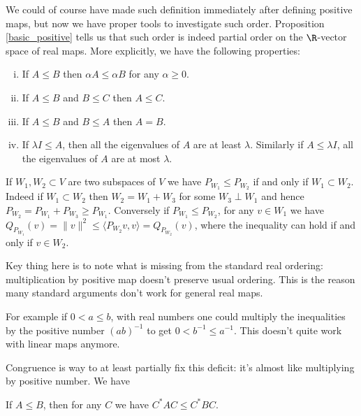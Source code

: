 We could of course have made such definition immediately after defining positive maps, but now we have proper tools to investigate such order. Proposition \ref{basic_positive} tells us that such order is indeed partial order on the $\R$-vector space of real maps. More explicitly, we have the following properties:


\begin{prop}
\begin{enumerate}[(i)]
		\item If $A \leq B$ then $\alpha A \leq \alpha B$ for any $\alpha \geq 0$.
		\item If $A \leq B$ and $B \leq C$ then $A \leq C$.
		\item If $A \leq B$ and $B \leq A$ then $A = B$.
		\item If $\lambda I \leq A$, then all the eigenvalues of $A$ are at least $\lambda$. Similarly if $A \leq \lambda I$, all the eigenvalues of $A$ are at most $\lambda$.
\end{enumerate}
\end{prop}

\begin{esim}
	If $W_{1}, W_{2} \subset V$ are two subspaces of $V$ we have $P_{W_{1}} \leq P_{W_{2}}$ if and only if $W_{1} \subset W_{2}$. Indeed if $W_{1} \subset W_{2}$ then $W_{2} = W_{1} + W_{3}$ for some $W_{3} \perp W_{1}$ and hence $P_{W_{2}} = P_{W_{1}} + P_{W_{3}} \geq P_{W_{1}}$. Conversely if $P_{W_{1}} \leq P_{W_{2}}$, for any $v \in W_{1}$ we have $Q_{{P_{W_{1}}}}(v) = \|v\|^{2} \leq \langle P_{W_{2}} v, v \rangle = Q_{P_{W_{2}}}(v)$, where the inequality can hold if and only if $v \in W_{2}$.
\end{esim}

Key thing here is to note what is missing from the standard real ordering: multiplication by positive map doesn't preserve usual ordering. This is the reason many standard arguments don't work for general real maps.

For example if $0 < a \leq b$, with real numbers one could multiply the inequalities by the positive number $(a b)^{-1}$ to get $0 < b^{-1} \leq a^{-1}$. This doesn't quite work with linear maps anymore.

Congruence is way to at least partially fix this deficit: it's almost like multiplying by positive number. We have
\begin{prop}
	If $A \leq B$, then for any $C$ we have $C^{*} A C \leq C^{*} B C$.
\end{prop}

